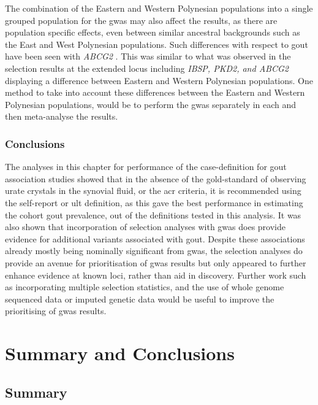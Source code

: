 \documentclass[]{report}
\begin{document}
The combination of the Eastern and Western Polynesian populations into a
single grouped population for the \gls{gwas} may also affect the
results, as there are population specific effects, even between similar
ancestral backgrounds such as the East and West Polynesian populations.
Such differences with respect to gout have been seen with \emph{ABCG2}
\citep{Phipps-Green2010}. This was similar to what was observed in the
selection results at the extended locus including \emph{IBSP, PKD2, and
ABCG2} displaying a difference between Eastern and Western Polynesian
populations. One method to take into account these differences between
the Eastern and Western Polynesian populations, would be to perform the
\gls{gwas} separately in each and then meta-analyse the results.

\subsection{Conclusions}\label{conclusions-1}

The analyses in this chapter for performance of the case-definition for
gout association studies showed that in the absence of the gold-standard
of observing urate crystals in the synovial fluid, or the \gls{acr}
criteria, it is recommended using the self-report or \gls{ult}
definition, as this gave the best performance in estimating the cohort
gout prevalence, out of the definitions tested in this analysis. It was
also shown that incorporation of selection analyses with \gls{gwas} does
provide evidence for additional variants associated with gout. Despite
these associations already mostly being nominally significant from
\gls{gwas}, the selection analyses do provide an avenue for
prioritisation of \gls{gwas} results but only appeared to further
enhance evidence at known loci, rather than aid in discovery. Further
work such as incorporating multiple selection statistics, and the use of
whole genome sequenced data or imputed genetic data would be useful to
improve the prioritising of \gls{gwas} results.

\chapter{Summary and Conclusions}\label{summary-and-conclusions}

\section{Summary}\label{summary}
\end{document}
